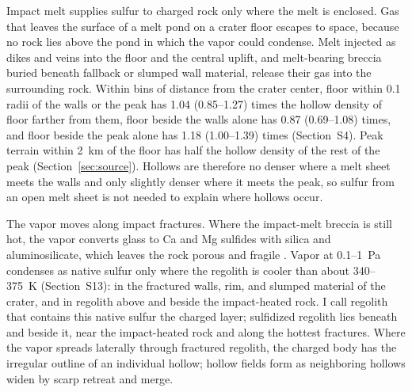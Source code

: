 \documentclass[article,review]{planetary}
\begin{document}
Impact melt supplies sulfur to charged rock only where the melt is enclosed. Gas that leaves the surface of a melt pond on a crater floor escapes to space, because no rock lies above the pond in which the vapor could condense. Melt injected as dikes and veins into the floor and the central uplift, and melt-bearing breccia buried beneath fallback or slumped wall material, release their gas into the surrounding rock. Within bins of distance from the crater center, floor within 0.1 radii of the walls or the peak has 1.04 (0.85--1.27) times the hollow density of floor farther from them, floor beside the walls alone has 0.87 (0.69--1.08) times, and floor beside the peak alone has 1.18 (1.00--1.39) times (Section~S4). Peak terrain within 2~km of the floor has half the hollow density of the rest of the peak (Section~\ref{sec:source}). Hollows are therefore no denser where a melt sheet meets the walls and only slightly denser where it meets the peak, so sulfur from an open melt sheet is not needed to explain where hollows occur.

The vapor moves along impact fractures. Where the impact-melt breccia is still hot, the vapor converts glass to Ca and Mg sulfides with silica and aluminosilicate, which leaves the rock porous and fragile \parencite{renggli2022,renggli2023}. Vapor at 0.1--1~Pa condenses as native sulfur only where the regolith is cooler than about 340--375~K (Section~S13): in the fractured walls, rim, and slumped material of the crater, and in regolith above and beside the impact-heated rock. I call regolith that contains this native sulfur the charged layer; sulfidized regolith lies beneath and beside it, near the impact-heated rock and along the hottest fractures. Where the vapor spreads laterally through fractured regolith, the charged body has the irregular outline of an individual hollow; hollow fields form as neighboring hollows widen by scarp retreat and merge.
\end{document}
